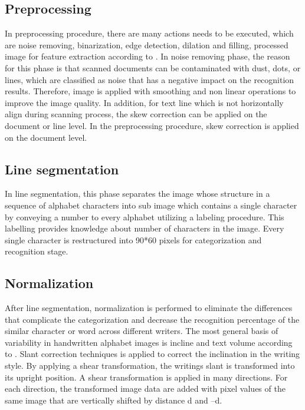 \subsection{Preprocessing}
In preprocessing procedure, there are many actions needs to be executed, which are noise removing, binarization, edge detection, dilation and filling, processed image for feature extraction according to \cite{12}. In noise removing phase, the reason for this phase is that scanned documents can be contaminated with dust, dots, or lines, which are classified as noise that has a negative impact on the recognition results. Therefore, image is applied with smoothing and non linear operations to improve the image quality. In addition, for text line which is not horizontally align during scanning process, the skew correction can be applied on the document or line level. In the preprocessing procedure, skew correction is applied on the document level.
\subsection{Line segmentation}
In line segmentation, this phase separates the image whose structure in a sequence of alphabet characters into sub image which contains a single character by conveying a number to every alphabet utilizing a labeling procedure. This labelling provides knowledge about number of characters in the image. Every single character is restructured into 90*60 pixels for categorization and recognition stage.
\subsection{Normalization}
After line segmentation, normalization is performed to eliminate the differences that complicate the categorization and decrease the recognition percentage of the similar character or word across different writers. The most general basis of variability in handwritten alphabet images is incline and text volume according to \cite{12}. Slant correction techniques is applied to correct the inclination in the writing style. By applying a shear transformation, the writings slant is transformed into its upright position. A shear transformation is applied in many directions. For each direction, the transformed image data are added with pixel values of the same image that are vertically shifted by distance d and –d.
